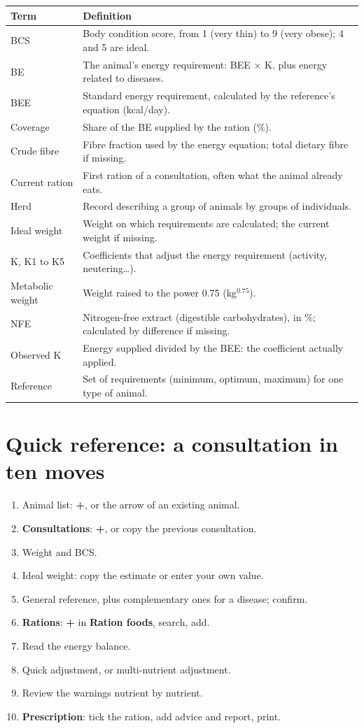 \documentclass[11pt,a4paper]{article}
\newcommand{\ui}[1]{\textsf{\textbf{#1}}}
\begin{document}
\begin{tabularx}{\linewidth}{@{}l X@{}}
\toprule
\textbf{Term} & \textbf{Definition} \\
\midrule
BCS & Body condition score, from 1 (very thin) to 9 (very obese); 4 and 5 are ideal. \\
BE & The animal's energy requirement: BEE × K, plus energy related to diseases. \\
BEE & Standard energy requirement, calculated by the reference's equation (kcal/day). \\
Coverage & Share of the BE supplied by the ration (\%). \\
Crude fibre & Fibre fraction used by the energy equation; total dietary fibre if missing. \\
Current ration & First ration of a consultation, often what the animal already eats. \\
Herd & Record describing a group of animals by groups of individuals. \\
Ideal weight & Weight on which requirements are calculated; the current weight if missing. \\
K, K1 to K5 & Coefficients that adjust the energy requirement (activity, neutering\ldots). \\
Metabolic weight & Weight raised to the power 0.75 (kg$^{0.75}$). \\
NFE & Nitrogen-free extract (digestible carbohydrates), in \%; calculated by difference if
missing. \\
Observed K & Energy supplied divided by the BEE: the coefficient actually applied. \\
Reference & Set of requirements (minimum, optimum, maximum) for one type of animal. \\
\bottomrule
\end{tabularx}

\section{Quick reference: a consultation in ten moves}

\begin{enumerate}
  \item Animal list: \ui{+}, or the arrow of an existing animal.
  \item \ui{Consultations}: \ui{+}, or copy the previous consultation.
  \item Weight and BCS.
  \item Ideal weight: copy the estimate or enter your own value.
  \item General reference, plus complementary ones for a disease; confirm.
  \item \ui{Rations}: \ui{+} in \ui{Ration foods}, search, add.
  \item Read the energy balance.
  \item Quick adjustment, or multi-nutrient adjustment.
  \item Review the warnings nutrient by nutrient.
  \item \ui{Prescription}: tick the ration, add advice and report, print.
\end{enumerate}
\end{document}
